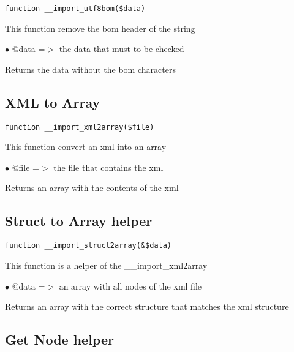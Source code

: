 \documentclass[a4paper]{book}
\begin{document}
\begin{lstlisting}
function __import_utf8bom($data)
\end{lstlisting}

This function remove the bom header of the string

\begin{compactitem}
\item[\color{myblue}$\bullet$] @data =$>$ the data that must to be checked
\end{compactitem}

Returns the data without the bom characters

\hypertarget{toc154}{}
\subsection{XML to Array}

\begin{lstlisting}
function __import_xml2array($file)
\end{lstlisting}

This function convert an xml into an array

\begin{compactitem}
\item[\color{myblue}$\bullet$] @file =$>$ the file that contains the xml
\end{compactitem}

Returns an array with the contents of the xml

\hypertarget{toc155}{}
\subsection{Struct to Array helper}

\begin{lstlisting}
function __import_struct2array(&$data)
\end{lstlisting}

This function is a helper of the \_\_import\_xml2array

\begin{compactitem}
\item[\color{myblue}$\bullet$] @data =$>$ an array with all nodes of the xml file
\end{compactitem}

Returns an array with the correct structure that matches the xml structure

\hypertarget{toc156}{}
\subsection{Get Node helper}
\end{document}
